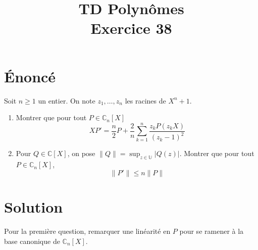 \documentclass[french]{article}
\title{TD Polynômes \\ Exercice 38}
\date{}
\newcommand{\C}{\mathbb{C}}
\newcommand{\U}{\mathbb{U}}
\begin{document}
\maketitle

\section{Énoncé}
Soit $n\geqslant 1$ un entier. On note $z_1,\ldots,z_n$ les racines de $X^n+1$.
\begin{enumerate}
	\item Montrer que pour tout $P\in\C_n[X]$ $$XP'=\frac{n}{2}P+\frac{2}{n}\sum_{k=1}^{n}\frac{z_kP(z_kX)}{(z_k-1)^2}$$
	\item Pour $Q\in\C[X]$, on pose $\lVert Q\rVert=\displaystyle\sup_{z\in\U}\lvert Q(z)\rvert$. Montrer que pour tout $P\in\C_n[X]$, $$\lVert P'\rVert\leqslant n\lVert P\rVert$$
\end{enumerate}
\section{Solution}
Pour la première question, remarquer une linéarité en $P$ pour se ramener à la base canonique de $\C_n[X]$.
\end{document}
